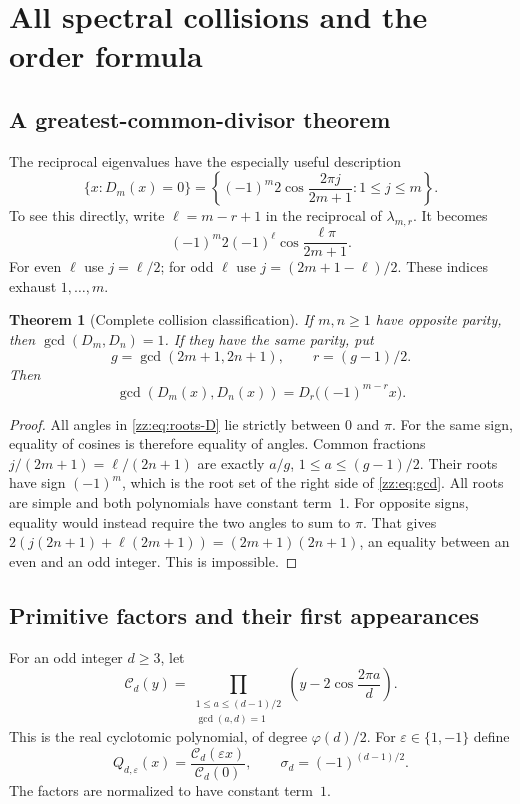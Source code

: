 \documentclass[11pt,a4paper]{article}
\newtheorem{theorem}{Theorem}[section]
\theoremstyle{definition}
\newcommand{\eps}{\varepsilon}
\begin{document}
\section{All spectral collisions and the order formula}
\label{zz:sec:collisions}
\subsection{A greatest-common-divisor theorem}
The reciprocal eigenvalues have the especially useful description
\begin{equation}\label{zz:eq:roots-D}
 \{x:D_m(x)=0\}
 =\left\{(-1)^m2\cos\frac{2\pi j}{2m+1}:1\le j\le m\right\}.
\end{equation}
To see this directly, write $\ell=m-r+1$ in the reciprocal of
$\lambda_{m,r}$.  It becomes
\[(-1)^m2(-1)^\ell\cos\frac{\ell\pi}{2m+1}.\]
For even $\ell$ use $j=\ell/2$; for odd $\ell$ use
$j=(2m+1-\ell)/2$.  These indices exhaust $1,\ldots,m$.

\begin{theorem}[Complete collision classification]
\label{zz:thm:gcd}
If $m,n\ge1$ have opposite parity, then $\gcd(D_m,D_n)=1$.
If they have the same parity, put
\[
 g=\gcd(2m+1,2n+1),\qquad r=(g-1)/2.
\]
Then
\begin{equation}\label{zz:eq:gcd}
 \gcd(D_m(x),D_n(x))=D_r\bigl((-1)^{m-r}x\bigr).
\end{equation}
\end{theorem}
\begin{proof}
All angles in \eqref{zz:eq:roots-D} lie strictly between $0$ and $\pi$.
For the same sign, equality of cosines is therefore equality of angles.
Common fractions $j/(2m+1)=\ell/(2n+1)$ are exactly $a/g$,
$1\le a\le(g-1)/2$.  Their roots have sign $(-1)^m$,
which is the root set of the right side of \eqref{zz:eq:gcd}.
All roots are simple and both polynomials have constant term~$1$.
For opposite signs, equality would instead require the two angles to sum
to $\pi$.  That gives
$2(j(2n+1)+\ell(2m+1))=(2m+1)(2n+1)$,
an equality between an even and an odd integer.  This is impossible.
\end{proof}

\subsection{Primitive factors and their first appearances}
For an odd integer $d\ge3$, let
\[
 \mathcal C_d(y)=
 \prod_{\substack{1\le a\le(d-1)/2\\\gcd(a,d)=1}}
 \left(y-2\cos\frac{2\pi a}{d}\right).
\]
This is the real cyclotomic polynomial, of degree $\varphi(d)/2$.
For $\eps\in\{1,-1\}$ define
\begin{equation}\label{zz:eq:Qfactor}
 Q_{d,\eps}(x)=\frac{\mathcal C_d(\eps x)}{\mathcal C_d(0)},\qquad
 \sigma_d=(-1)^{(d-1)/2}.
\end{equation}
The factors are normalized to have constant term~$1$.
\end{document}
